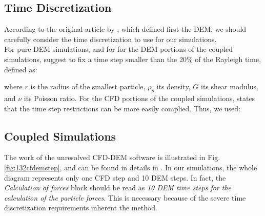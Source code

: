 \subsection{Time Discretization}
\label{subsec:timestep}

According to the original article by \citet{RefWorks:172}, which defined first
the \acs{DEM}, we should carefully consider the time discretization to use for
our simulations.\\
For pure \acs{DEM} simulations, and for for the \acs{DEM} portions of the
coupled simulations, \citet{RefWorks:172} suggest to fix a time step smaller
than the 20\% of the Rayleigh time, defined as:

where $r$ is the radius of the smallest particle, $\rho_p$ its density, $G$ its
shear modulus, and $\nu$ its Poisson ratio.
For the \acs{CFD} portions of the coupled simulations, \citet{RefWorks:201}
states that the time step restrictions can be more easily complied.
Thus, we used:


\subsection{Coupled Simulations}
\label{subsec:coupledsimulations}



The work of the unresolved \acs{CFD}-\acs{DEM} software is
illustrated in Fig. \ref{fig:132cfdemstep}, and can be
found in details in \citet{RefWorks:201}.
In our simulations, the whole diagram represents only one \acs{CFD} step and 10
\acs{DEM} steps. 
In fact, the \textit{Calculation of forces} block should be read as
\textit{10 \acs{DEM} time steps for the calculation of the particle forces}.
This is necessary because of the severe time discretization requirements
inherent the method.
